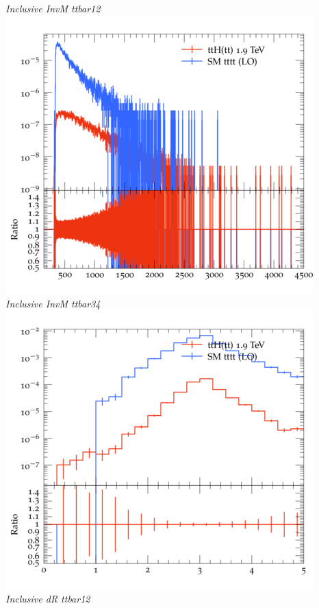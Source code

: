 \documentclass{beamer}
\begin{document}
\begin{frame}
\begin{columns}
\textit{\small Inclusive InvM ttbar12}
\includegraphics[width=\textwidth]{../plots/ttH_1900/tttt_ttH/Inclusive_InvM_ttbar34.png}\\
\textit{\small Inclusive InvM ttbar34}
\includegraphics[width=\textwidth]{../plots/ttH_1900/tttt_ttH/Inclusive_dR_ttbar12.png}\\
\textit{\small Inclusive dR ttbar12}
\end{columns}
\end{frame}
\end{document}
